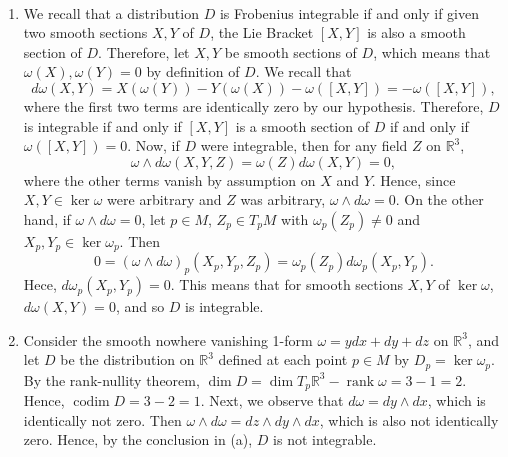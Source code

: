 \documentclass{article}
\begin{document}
\begin{solutions}
	$ $\newline \vspace{-1cm}
	\begin{enumerate}[itemsep=-2pt,label = (\alph{*})]
		\item We recall that a distribution $D$ is Frobenius integrable if and only if given two smooth sections $X, Y$ of $D$, the Lie Bracket $[X, Y]$ is also a smooth section of $D$. Therefore, let $X, Y$ be smooth sections of $D$, which means that $\omega(X), \omega(Y) = 0$ by definition of $D$. We recall that 
			\begin{equation}
				d\omega(X, Y) = X(\omega(Y)) - Y(\omega(X)) - \omega([X, Y]) = -\omega([X, Y]), 
			\end{equation}
		where the first two terms are identically zero by our hypothesis. Therefore, $D$ is integrable if and only if $[X, Y]$ is a smooth section of $D$ if and only if $\omega([X, Y]) = 0$. Now, if $D$ were integrable, then for any field $Z$ on $\mathbb{R}^{3}$, 
			\begin{equation}
				\omega \wedge d\omega(X, Y,Z) = \omega(Z)d\omega(X, Y) = 0, 
			\end{equation}
		where the other terms vanish by assumption on $X$ and $Y$. Hence, since $X,Y \in \ker{\omega}$ were arbitrary and $Z$ was arbitrary, $\omega \wedge d\omega = 0$. On the other hand, if $\omega \wedge d\omega = 0$, let $p\in M$, $Z_{p} \in T_{p}M$ with $\omega_{p}(Z_{p}) \neq 0$ and $X_{p}, Y_{p} \in \ker{\omega_{p}}$. Then 
			\begin{equation}
				0 = (\omega \wedge d\omega)_{p}(X_{p}, Y_{p}, Z_{p}) = \omega_{p}(Z_{p})d\omega_{p}(X_{p}, Y_{p}). 
			\end{equation}
		Hece, $d\omega_{p}(X_{p}, Y_{p}) = 0$. This means that for smooth sections $X, Y$ of $\ker{\omega}$, $d\omega(X, Y) = 0$, and so $D$ is integrable. 
		\item Consider the smooth nowhere vanishing 1-form $\omega = ydx + dy + dz$ on $\mathbb{R}^{3}$, and let $D$ be the distribution on $\mathbb{R}^{3}$ defined at each point $p \in M$ by $D_{p} = \ker{\omega_{p}}$. By the rank-nullity theorem, $\operatorname{dim}{D} = \operatorname{dim}{T_{p}\mathbb{R}^{3}} - \operatorname{rank}{\omega} = 3 - 1 = 2$. Hence, $\operatorname{codim}{D} = 3 - 2 = 1$. Next, we observe that $d\omega = dy \wedge dx$, which is identically not zero. Then $\omega \wedge d\omega = dz \wedge dy \wedge dx$, which is also not identically zero. Hence, by the conclusion in (a), $D$ is not integrable. 
	\end{enumerate}
\end{solutions}
\end{document}
